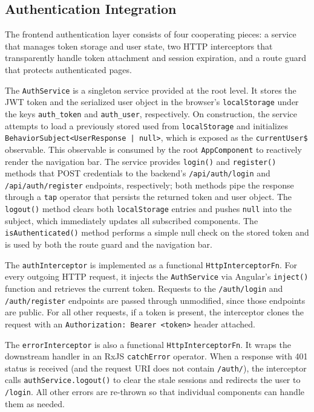 \subsection{Authentication Integration}
\label{subsec:frontend-auth}

\par The frontend authentication layer consists of four cooperating pieces: a service that manages token storage and user state, two HTTP interceptors that transparently handle token attachment and session expiration, and a route guard that protects authenticated pages.

The \texttt{AuthService} is a singleton service provided at the root level. It stores the JWT token and the serialized user object in the browser's \texttt{localStorage} under the keys \texttt{auth\_token} and \texttt{auth\_user}, respectively. On construction, the service attempts to load a previously stored used from \texttt{localStorage} and initializes \texttt{BehaviorSubject<UserResponse | null>}, which is exposed as the \texttt{cur\-rentUser\$} observable. This observable is consumed by the root \texttt{AppComponent} to reactively render the navigation bar. The service provides \texttt{login()} and \texttt{re\-gis\-ter()} methods that POST credentials to the backend's \texttt{/api/auth/login} and \texttt{/api/\-auth/\-re\-gis\-ter} endpoints, respectively; both methods pipe the response through a \texttt{tap} operator that persists the returned token and user object. The \texttt{logout()} method clears both \texttt{localStorage} entries and pushes \texttt{null} into the subject, which immediately updates all subscribed components. The \texttt{is\-Au\-then\-ti\-cated()} method performs a simple null check on the stored token and is used by both the route guard and the navigation bar.

The \texttt{authInterceptor} is implemented as a functional \texttt{HttpInterceptorFn}. For every outgoing HTTP request, it injects the \texttt{AuthService} via Angular's \texttt{in\-ject()} function and retrieves the current token. Requests to the \texttt{/auth/login} and \texttt{/auth/re\-gis\-ter} endpoints are passed through unmodified, since those endpoints are public. For all other requests, if a token is present, the interceptor clones the request with an \texttt{Authorization: Bearer <token>} header attached.

The \texttt{errorInterceptor} is also a functional \texttt{HttpInterceptorFn}. It wraps the downstream handler in an RxJS \texttt{catchError} operator. When a response with 401 status is received (and the request URI does not contain \texttt{/auth/}), the interceptor calls \texttt{authService.logout()} to clear the stale sessions and redirects the user to \texttt{/login}. All other errors are re-thrown so that individual components can handle them as needed.


